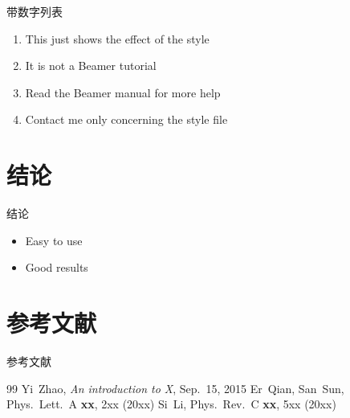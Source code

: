 \documentclass[10pt,aspectratio=169]{beamer}
\begin{document}
\begin{frame}{带数字列表}
  \begin{enumerate}
    \item This just shows the effect of the style
    \item It is not a Beamer tutorial
    \item Read the Beamer manual for more help
    \item Contact me only concerning the style file
  \end{enumerate}
\end{frame}

\section{结论}
\begin{frame}{结论}
  \begin{itemize}
    \item Easy to use
    \item Good results
  \end{itemize}
\end{frame}

\section{参考文献}
\begin{frame}{参考文献}
  \begin{thebibliography}{99}
      Yi~Zhao, \textit{An introduction to X}, Sep.~15, 2015
      Er~Qian, San~Sun,
      Phys.\ Lett.\ A \textbf{xx}, 2xx (20xx)
      Si~Li, Phys.\ Rev.\ C \textbf{xx}, 5xx (20xx)
  \end{thebibliography}
\end{frame}
\end{document}
